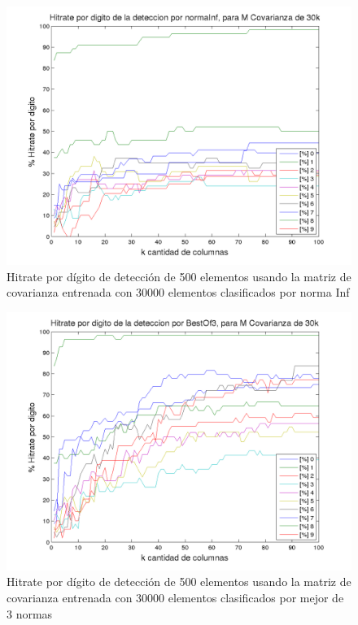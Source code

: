 \begin{figure}[H]
\begin {center}
\includegraphics[width=\pdwidth]{plots/pordig-30kcv-normaInf.png}
\end {center}
\caption{Hitrate por d\'igito de detecci\'on de 500 elementos usando la matriz de covarianza entrenada con 30000 elementos
clasificados por norma Inf}
\label{fig:HRD30kcv-ninf}
\end{figure}

\begin{figure}[H]
\begin {center}
\includegraphics[width=\pdwidth]{plots/pordig-30kcv-BestOf3.png}
\end {center}
\caption{Hitrate por d\'igito de detecci\'on de 500 elementos usando la matriz de covarianza entrenada con 30000 elementos
clasificados por mejor de 3 normas}
\label{fig:HRD30kcv-bo3}
\end{figure}

